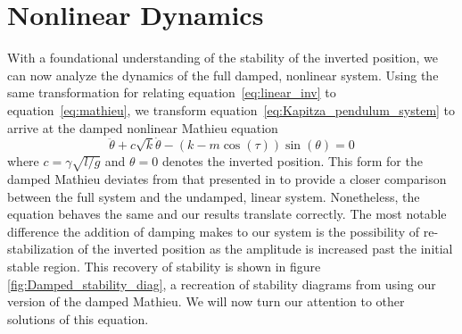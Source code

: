 \documentclass[12pt, letterpaper]{article}
\begin{document}
\section{Nonlinear Dynamics}\label{sec:nonlinear_dynamics}
With a foundational understanding of the stability of the inverted position, we can now analyze the dynamics of the full damped, nonlinear system. Using the same transformation for relating equation~\eqref{eq:linear_inv} to equation~\eqref{eq:mathieu}, we transform equation~\eqref{eq:Kapitza_pendulum_system} to arrive at the damped nonlinear Mathieu equation 
\begin{equation}
    \ddot{\theta} +c\sqrt{k}\dot{\theta} - \left(k - m \cos(\tau)\right)\sin(\theta) = 0
    \label{eq:damped_mathieu}
\end{equation}
where $c = \gamma\sqrt{l/g}$ and $\theta=0$ denotes the inverted position. This form for the damped Mathieu deviates from that presented in \cite{kim1998hu} to provide a closer comparison between the full system and the undamped, linear system. Nonetheless, the equation behaves the same and our results translate correctly. The most notable difference the addition of damping makes to our system is the possibility of re-stabilization of the inverted position as the amplitude is increased past the initial stable region. This recovery of stability is shown in figure \ref{fig:Damped_stability_diag}, a recreation of stability diagrams from \cite{kim1998hu} using our version of the damped Mathieu. We will now turn our attention to other solutions of this equation.
\end{document}
